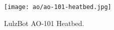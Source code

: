 
\begin{figure}[h!]
\texttt{[image: ao/ao-101-heatbed.jpg]}
 \caption{LulzBot AO-101 Heatbed.}
 \label{fig:ao-101-heatbed}
\end{figure}



